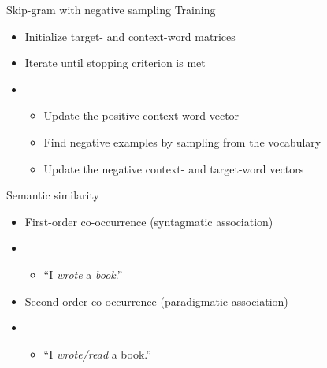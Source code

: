 \documentclass[10pt]{beamer}
\begin{document}
\begin{frame}{Skip-gram with negative sampling}
  {Training}
  \begin{itemize}
    \item Initialize target- and context-word matrices
    \item Iterate until stopping criterion is met
    \item[]
          \begin{itemize}
            \item Update the positive context-word vector
            \item Find negative examples by sampling from the vocabulary
            \item Update the negative context- and target-word vectors
          \end{itemize}
  \end{itemize}
\end{frame}

\begin{frame}{Semantic similarity}
  \begin{itemize}
    \item First-order co-occurrence (syntagmatic association)
    \item[]
          \begin{itemize}
            \item ``I \textit{wrote} a \textit{book}.''
          \end{itemize}
    \item Second-order co-occurrence (paradigmatic association)
    \item[]
          \begin{itemize}
            \item ``I \textit{wrote/read} a book.''
          \end{itemize}
  \end{itemize}
\end{frame}
\end{document}
